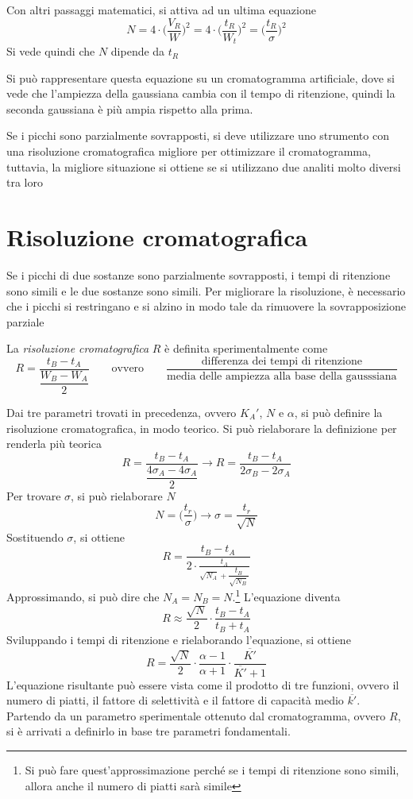 Con altri passaggi matematici, si attiva ad un ultima equazione
\[
N = 4 \cdot \biggl(\frac{V_R}{W}\biggr)^2 = 4 \cdot \biggl(\frac{t_R}{W_t}\biggr)^2 = \biggl(\frac{t_R}{\sigma}\biggr)^2
\]
Si vede quindi che $N$ dipende da $t_R$

Si può rappresentare questa equazione su un cromatogramma artificiale, dove si vede che l'ampiezza della gaussiana cambia con il tempo di ritenzione, quindi la seconda gaussiana è più ampia rispetto alla prima.


Se i picchi sono parzialmente sovrapposti, si deve utilizzare uno strumento con una risoluzione cromatografica migliore per ottimizzare il cromatogramma, tuttavia, la migliore situazione si ottiene se si utilizzano due analiti molto diversi tra loro

\section{Risoluzione cromatografica}
Se i picchi di due sostanze sono parzialmente sovrapposti, i tempi di ritenzione sono simili e le due sostanze sono simili. Per migliorare la risoluzione, è necessario che i picchi si restringano e si alzino in modo tale da rimuovere la sovrapposizione parziale

La \emph{risoluzione cromatografica} $R$ è definita sperimentalmente come
\[
R = \frac{t_B - t_A}{\dfrac{W_B- W_A}{2}} \qquad \text{ovvero} \qquad \frac{\text{differenza dei tempi di ritenzione}}{\text{media delle ampiezza alla base della gausssiana}} 
\]


Dai tre parametri trovati in precedenza, ovvero $K_A'$, $N$ e $\alpha$, si può definire la risoluzione cromatografica, in modo teorico. Si può rielaborare la definizione per renderla più teorica
\[
R = \frac{t_B - t_A}{\dfrac{4\sigma_A - 4\sigma_A}{2}} \longrightarrow R = \frac{t_B - t_A}{2\sigma_B - 2\sigma_A}
\]
Per trovare $\sigma$, si può rielaborare $N$
\[
N = \biggl(\frac{t_r}{\sigma}\biggr) \longrightarrow \sigma = \frac{t_r}{\sqrt{N}}
\]
Sostituendo $\sigma$, si ottiene
\[
R = \frac{t_B - t_A}{2 \cdot \frac{t_A}{\sqrt{N_A} + \dfrac{t_B}{\sqrt{N_B}}}}
\]
Approssimando, si può dire che $N_A = N_B = N$.\footnote{Si può fare quest'approssimazione perché se i tempi di ritenzione sono simili, allora anche il numero di piatti sarà simile} L'equazione diventa
\[
R \approx \frac{\sqrt{N}}{2} \cdot \frac{t_B - t_A}{t_B + t_A}
\]
Sviluppando i tempi di ritenzione e rielaborando l'equazione, si ottiene
\[
R = \frac{\sqrt{N}}{2} \cdot \frac{\alpha - 1}{\alpha + 1} \cdot \frac{\overline{K'}}{\overline{K'} + 1}
\]
L'equazione risultante può essere vista come il prodotto di tre funzioni, ovvero il numero di piatti, il fattore di selettività e il fattore di capacità medio $\overline{k'}$. Partendo da un parametro sperimentale ottenuto dal cromatogramma, ovvero $R$, si è arrivati a definirlo in base tre parametri fondamentali.
